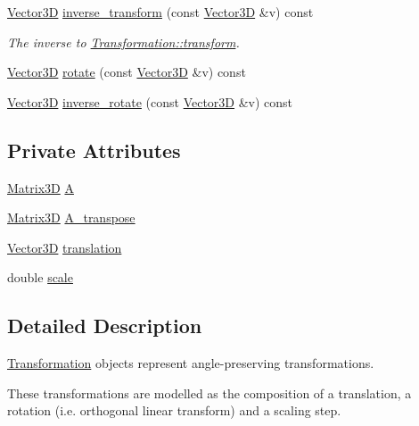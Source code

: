 \begin{DoxyCompactItemize}
\item 
\hyperlink{classVector3D}{Vector3D} \hyperlink{classlinalg_1_1Transformation_a5c37fe3a882f9d29ea7382d1fe73843d}{inverse\+\_\+transform} (const \hyperlink{classVector3D}{Vector3D} \&v) const 
\begin{DoxyCompactList}\small\item\em The inverse to \hyperlink{classlinalg_1_1Transformation_a5b31c95da6547d580236566266c840a6}{Transformation\+::transform}. \end{DoxyCompactList}\item 
\hyperlink{classVector3D}{Vector3D} \hyperlink{classlinalg_1_1Transformation_a186fce9fbf82aa998cf1f92d2be5b10c}{rotate} (const \hyperlink{classVector3D}{Vector3D} \&v) const 
\item 
\hyperlink{classVector3D}{Vector3D} \hyperlink{classlinalg_1_1Transformation_a01cfc4e7905418f1c1091cebebbb8580}{inverse\+\_\+rotate} (const \hyperlink{classVector3D}{Vector3D} \&v) const 
\end{DoxyCompactItemize}
\subsection*{Private Attributes}
\begin{DoxyCompactItemize}
\item 
\hyperlink{classlinalg_1_1Matrix3D}{Matrix3D} \hyperlink{classlinalg_1_1Transformation_a24a75d79007bc9b5c5f32c042fb4332b}{A}
\item 
\hyperlink{classlinalg_1_1Matrix3D}{Matrix3D} \hyperlink{classlinalg_1_1Transformation_ac720d71bf88660e2ae3f3d776c7cfd01}{A\+\_\+transpose}
\item 
\hyperlink{classVector3D}{Vector3D} \hyperlink{classlinalg_1_1Transformation_a462cf5d72735591b01bef5186bb1fe98}{translation}
\item 
double \hyperlink{classlinalg_1_1Transformation_ac627b1362463a8c98fe3b5e633beb049}{scale}
\end{DoxyCompactItemize}


\subsection{Detailed Description}
\hyperlink{classlinalg_1_1Transformation}{Transformation} objects represent angle-\/preserving transformations. 

These transformations are modelled as the composition of a translation, a rotation (i.\+e. orthogonal linear transform) and a scaling step. 

